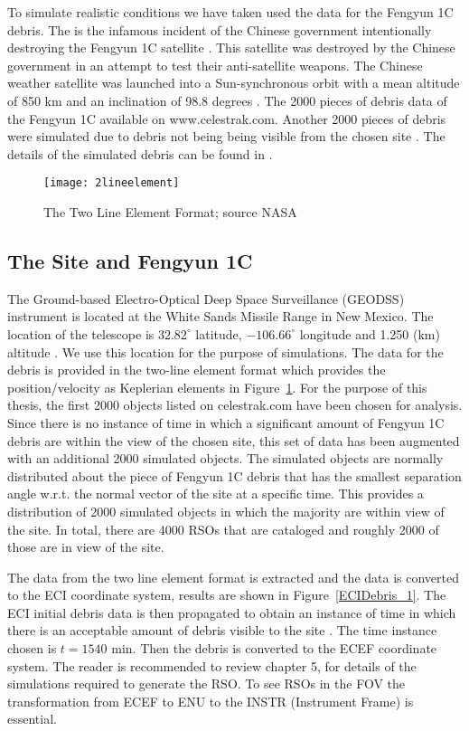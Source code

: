 \documentclass[]{aiaa-tc}%
\begin{document}
To simulate realistic conditions we have taken used the data for the Fengyun 1C debris. The is the infamous incident of the Chinese government intentionally destroying the Fengyun 1C satellite . This satellite was destroyed by the Chinese government in an attempt to test their anti-satellite weapons.  The Chinese weather satellite was launched into a Sun-synchronous orbit with a mean altitude of 850 km and an inclination of 98.8 degrees \cite{johnson_characteristics_2008}. The 2000 pieces of debris data of the Fengyun 1C available on www.celestrak.com. Another 2000 pieces of debris were simulated due to debris not being  being visible from the chosen site \cite{silversmith}. The details of the simulated debris can be found in \cite{silversmith}.

\begin{figure}[h]
\centering
\texttt{[image: 2lineelement]}
\caption{The Two Line Element Format; source NASA}
\label{TLE}
\end{figure}

\subsection{The Site and Fengyun 1C}

The Ground-based Electro-Optical Deep Space Surveillance (GEODSS) instrument is located at the White Sands Missile Range in New Mexico. The location of the telescope is $32.82^{\circ}$ latitude, $-106.66^{\circ}$ longitude and 1.250 (km) altitude \cite{silversmith}. We use this location for the purpose of simulations.
The data for the debris is provided in the two-line element format which provides the position/velocity as Keplerian elements in Figure~\ref{TLE}. For the purpose of this thesis, the first 2000 objects listed on celestrak.com have been chosen for analysis. Since there is no instance of time in which a significant amount of Fengyun 1C debris are within the view of the chosen site, this set of data has been augmented with an additional 2000 simulated objects. The simulated objects are normally distributed about the piece of Fengyun 1C debris that has the smallest separation angle w.r.t. the normal vector of the site at a specific
time. This provides a distribution of 2000 simulated objects in which the majority are within view of the site. In total, there are 4000 RSOs that are cataloged and roughly 2000 of those are in view of the site.




The data from the two line element format is extracted and the data is converted to the ECI coordinate system, results are shown in Figure~\ref{ECIDebris_1}. The ECI initial debris data is then propagated to obtain an instance of time in which there is an acceptable amount of debris visible to the site \cite{silversmith}. The time instance chosen is $t = 1540$ min. Then the debris is converted to the ECEF coordinate system. The reader is recommended to review \cite{silversmith} chapter 5, for details of the simulations required to generate the RSO. To see RSOs in the FOV the transformation from ECEF to ENU to the INSTR (Instrument Frame) is essential.
\end{document}
